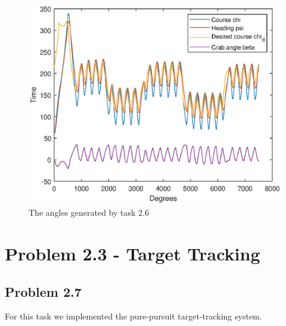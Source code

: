 \begin{figure}[ht]
	\centering
	\includegraphics[width=\textwidth]{angles2_6}
	\caption{The angles generated by task 2.6}
	\label{fig:angles2_6}
\end{figure}

\section*{Problem 2.3 - Target Tracking}
\subsection*{Problem 2.7}
For this task we implemented the pure-pursuit target-tracking system. 

